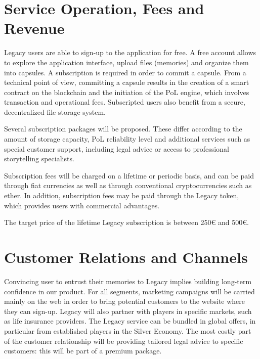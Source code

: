 \section{Service Operation, Fees and Revenue} %
\label{sec:service_operation_fees_and_revenue}
Legacy users are able to sign-up to the application for free. A free account allows to explore the application interface, upload files (memories) and organize them into capsules. A subscription is required in order to commit a capsule. From a technical point of view, committing a capsule results in the creation of a smart contract on the blockchain and the initiation of the PoL engine, which involves transaction and operational fees. Subscripted users also benefit from a secure, decentralized file storage system.

Several subscription packages will be proposed. These differ according to the amount of storage capacity, PoL reliability level and additional services such as special customer support, including legal advice or access to professional storytelling specialists.

Subscription fees will be charged on a lifetime or periodic basis, and can be paid through fiat currencies as well as through conventional cryptocurrencies such as ether. In addition, subscription fees may be paid through the Legacy token, which provides users with commercial advantages.

The target price of the lifetime Legacy subscription is between 250€ and 500€.

\section{Customer Relations and Channels} %
\label{sec:customer_relations_and_channels}
Convincing user to entrust their memories to Legacy implies building long-term confidence in our product.
For all segments, marketing campaigns will be carried mainly on the web in order to bring potential customers to the website where they can sign-up.
Legacy will also partner with players in specific markets, such as life insurance providers. The Legacy service can be bundled in global offers, in particular from established players in the Silver Economy.
The most costly part of the customer relationship will be providing tailored legal advice to specific customers: this will be part of a premium package.

